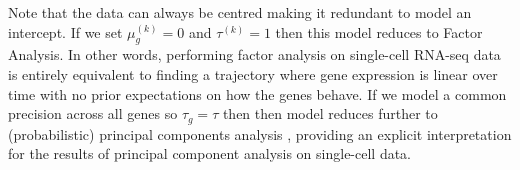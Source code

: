 Note that the data can always be centred making it redundant to model an intercept. If we set $\mu^{(k)}_g = 0$ and $\tau^{(k)} = 1$ then this model reduces to Factor Analysis. In other words, performing factor analysis on single-cell RNA-seq data is entirely equivalent to finding a trajectory where gene expression is linear over time with no prior expectations on how the genes behave. If we model a common precision across all genes so $\tau_g = \tau$ then then model reduces further to
(probabilistic) principal components analysis \cite{tipping1999probabilistic}, providing an explicit interpretation for the results of principal component analysis on single-cell data.
